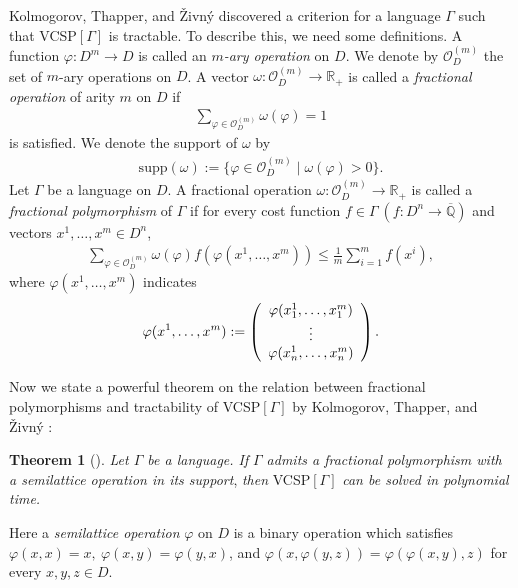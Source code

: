 \documentclass[11pt]{article}
\theoremstyle{definition}
\newtheorem{theorem}{Theorem}[section]
\begin{document}
Kolmogorov, Thapper, and \v{Z}ivn\'{y} \cite{kolmogorov2015} discovered a criterion for a language $\Gamma$ such that VCSP$[\Gamma]$ is tractable. To describe this, we need some definitions. A function $\varphi:D^m\rightarrow D$ is called an $m$\textit{-ary operation} on $D$. We denote by $\mathcal{O}_D^{(m)}$ the set of $m$-ary operations on $D$. 
A vector $\omega:\mathcal{O}^{(m)}_D\rightarrow \mathbb{R}_+$ is called a \textit{fractional operation} of arity $m$ on $D$ if 
\begin{align}
\label{frac}
    \sum_{\varphi \in \mathcal{O}^{(m)}_D}\omega(\varphi)=1
\end{align}
is satisfied. We denote the support of $\omega$ by
\begin{align}
\label{supp}
    \mathrm{supp}(\omega):=\{\varphi \in \mathcal{O}^{(m)}_D\mid \omega(\varphi)>0\}.
\end{align}
Let $\Gamma$ be a language on $D$. A fractional operation $\omega:\mathcal{O}^{(m)}_D\rightarrow \mathbb{R}_+$ is called a \textit{fractional polymorphism} of $\Gamma$ if for every cost function $f\in \Gamma\ (f:D^n\rightarrow \overline{\mathbb{Q}})$ and vectors $x^1,\ldots,x^m\in D^n$, 
\begin{align}
\label{polymorphism}
    \sum_{\varphi \in \mathcal{O}^{(m)}_D}\omega(\varphi)f(\varphi(x^1,\ldots,x^m))\leq \frac{1}{m}\sum_{i=1}^mf(x^i),
\end{align}
where $\varphi(x^1,\ldots,x^m)$ indicates
\begin{align}
    \varphi(x^1,\ldots,x^m):=\left(
    \begin{array}{c}
      \varphi(x_1^1,\ldots,x_1^m) \\
      \vdots \\
      \varphi(x_n^1,\ldots,x_n^m)
    \end{array}
  \right).\notag
\end{align}

Now we state a powerful theorem on the relation between fractional polymorphisms and tractability of VCSP$[\Gamma]$ by Kolmogorov, Thapper, and \v{Z}ivn\'{y} 
\cite{kolmogorov2015}:
\begin{theorem}[\cite{kolmogorov2015}]
\label{vcsp}
\textit{Let $\Gamma$ be a language. If}\textit{ $\Gamma$ admits a fractional polymorphism with a semilattice operation in its support},\textit{ then} VCSP$[\Gamma]$ \textit{can be solved in polynomial time.}
\end{theorem}
Here a \textit{semilattice operation} $\varphi$ on $D$ is a binary operation which satisfies $\varphi(x,x)=x,\ \varphi(x,y)=\varphi(y,x)$, and $\varphi(x,\varphi(y,z))=\varphi(\varphi(x,y),z)$ for every $x,y,z\in D$.
\end{document}
